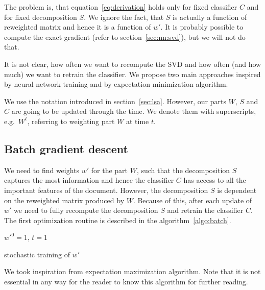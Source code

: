     The problem is, that equation~\ref{eq:derivation} holds only for fixed classifier $C$ and for fixed decomposition $S$. 
    We ignore the fact, that $S$ is actually a function of reweighted matrix and hence it is a function of $w'$.
    It is probably possible to compute the exact gradient (refer to section~\ref{sec:nn:svd}), but we will not do that.
    
    It is not clear, how often we want to recompute the SVD and how often (and how much) we want to retrain the classifier.
    We propose two main approaches inspired by neural network training and by 
    expectation minimization algorithm.
    
    We use the notation introduced in section~\ref{sec:lsa}.
    However, our parts $W$, $S$ and $C$ are going to be updated through the time. We denote them with superscripts, e.g.~$W^t$, referring to weighting part $W$ at time $t$.
    
    \subsection{Batch gradient descent}
    
    We need to find weights $w'$ for the part $W$, 
    such that the decomposition $S$ captures the most information and hence the classifier $C$ has access to all the important features of the document.
    However, the decomposition $S$ is dependent on the reweighted matrix produced by $W$. 
    Because of this, after each update of $w'$ we need to fully recompute the decomposition $S$ and retrain the classifier $C$.
    The first optimization routine is described in the algorithm~\ref{algo:batch}.
    
    \medskip
    
    \begin{algorithm}[H]
        $w'^0 = 1$, $t=1$\;
        \caption{stochastic training of $w'$} \label{algo:batch}
    \end{algorithm}
    
    We took inspiration from expectation maximization algorithm.  
    Note that it is not essential in any way for the reader to know this algorithm for further reading.
    
